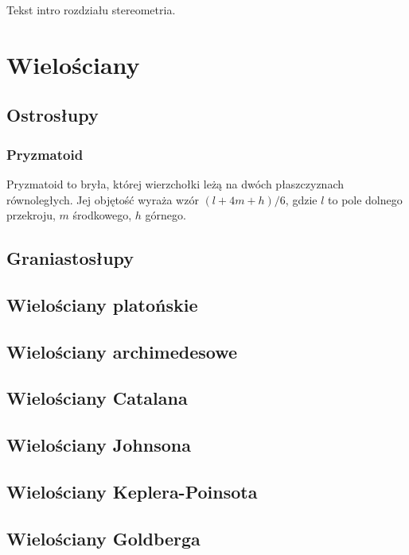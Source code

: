
Tekst intro rozdziału stereometria.

\section{Wielościany}
\subsection{Ostrosłupy}


\subsubsection{Pryzmatoid}
Pryzmatoid to bryła, której wierzchołki leżą na dwóch płaszczyznach równoległych.
Jej objętość wyraża wzór $(l + 4m + h)/ 6$, gdzie $l$ to pole dolnego przekroju, $m$ środkowego, $h$ górnego. %


\subsection{Graniastosłupy}

\subsection{Wielościany platońskie}


\subsection{Wielościany archimedesowe}


\subsection{Wielościany Catalana}


\subsection{Wielościany Johnsona}


\subsection{Wielościany Keplera-Poinsota}


\subsection{Wielościany Goldberga}

